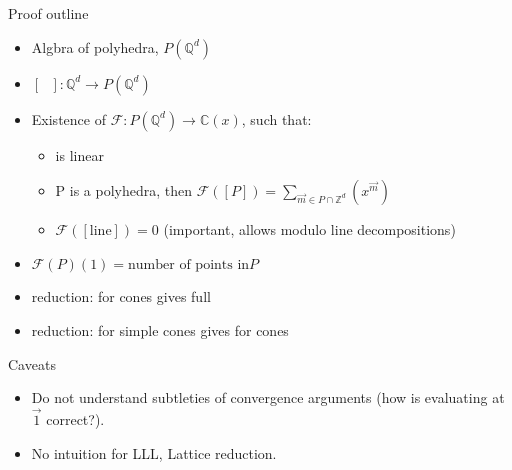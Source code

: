 \documentclass[8pt]{beamer}
\begin{document}
\begin{frame}[label=sec-5]{Proof outline}
\begin{itemize}
\item Algbra of polyhedra, $P(\mathbb{Q}^d)$
\item $[\text{ }] : \mathbb{Q}^d \rightarrow P(\mathbb{Q}^d)$
\item Existence of $\mathcal{F}: P(\mathbb{Q}^d) \rightarrow \mathbb{C}(x)$, such that:
\begin{itemize}
\item {} is linear
\item P is a polyhedra, then $\mathcal{F}([P]) = \sum_{\vec{m} \in P \cap \mathbb{Z}^d} (x^{\vec{m}} )$
\item $\mathcal{F}([\text{line}]) = 0$ (important, allows modulo line decompositions)
\end{itemize}
\item $\mathcal{F}(P)(1) = \text{number of points in} P$
\item reduction:  for cones gives full 
\item reduction:  for simple cones gives  for cones
\end{itemize}
\end{frame}


\begin{frame}[label=sec-6]{Caveats}
\begin{itemize}
\item Do not understand subtleties of convergence arguments (how is evaluating at $\vec{1}$ correct?).
\item No intuition for LLL, Lattice reduction.
\end{itemize}
\end{frame}
\end{document}
